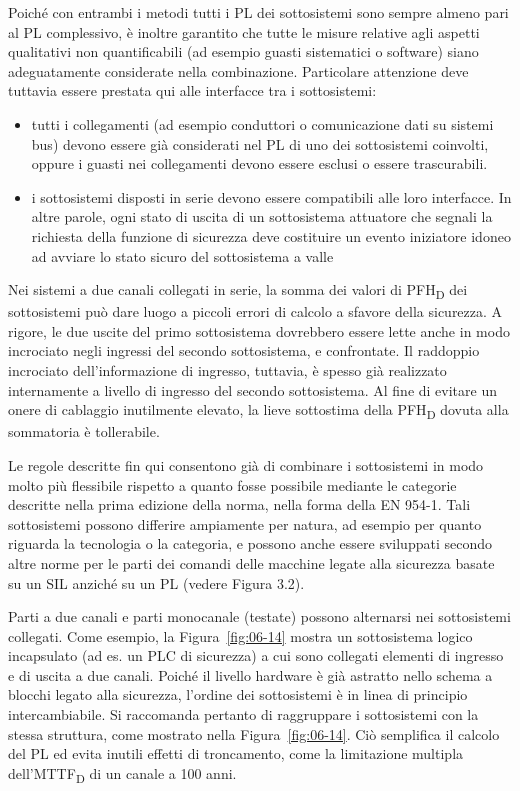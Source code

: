 Poiché con entrambi i metodi tutti i PL dei sottosistemi sono sempre almeno pari al PL complessivo, è inoltre garantito che tutte le misure relative agli aspetti qualitativi non quantificabili (ad esempio guasti sistematici o software) siano adeguatamente considerate nella combinazione. Particolare attenzione deve tuttavia essere prestata qui alle interfacce tra i sottosistemi:
\begin{itemize}
    \item tutti i collegamenti (ad esempio conduttori o comunicazione dati su sistemi bus) devono essere già considerati nel PL di uno dei sottosistemi coinvolti, oppure i guasti nei collegamenti devono essere esclusi o essere trascurabili.
    \item i sottosistemi disposti in serie devono essere compatibili alle loro interfacce. In altre parole, ogni stato di uscita di un sottosistema attuatore che segnali la richiesta della funzione di sicurezza deve costituire un evento iniziatore idoneo ad avviare lo stato sicuro del sottosistema a valle
\end{itemize}

Nei sistemi a due canali collegati in serie, la somma dei valori di PFH\textsubscript{D} dei sottosistemi può dare luogo a piccoli errori di calcolo a sfavore della sicurezza. A rigore, le due uscite del primo sottosistema dovrebbero essere lette anche in modo incrociato negli ingressi del secondo sottosistema, e confrontate. Il raddoppio incrociato dell'informazione di ingresso, tuttavia, è spesso già realizzato internamente a livello di ingresso del secondo sottosistema. Al fine di evitare un onere di cablaggio inutilmente elevato, la lieve sottostima della PFH\textsubscript{D} dovuta alla sommatoria è tollerabile.

Le regole descritte fin qui consentono già di combinare i sottosistemi in modo molto più flessibile rispetto a quanto fosse possibile mediante le categorie descritte nella prima edizione della norma, nella forma della EN 954-1. Tali sottosistemi possono differire ampiamente per natura, ad esempio per quanto riguarda la tecnologia o la categoria, e possono anche essere sviluppati secondo altre norme per le parti dei comandi delle macchine legate alla sicurezza basate su un SIL anziché su un PL (vedere Figura 3.2).

Parti a due canali e parti monocanale (testate) possono alternarsi nei sottosistemi collegati. Come esempio, la Figura~\ref{fig:06-14} mostra un sottosistema logico incapsulato (ad es. un PLC di sicurezza) a cui sono collegati elementi di ingresso e di uscita a due canali. Poiché il livello hardware è già astratto nello schema a blocchi legato alla sicurezza, l'ordine dei sottosistemi è in linea di principio intercambiabile. Si raccomanda pertanto di raggruppare i sottosistemi con la stessa struttura, come mostrato nella Figura~\ref{fig:06-14}. Ciò semplifica il calcolo del PL ed evita inutili effetti di troncamento, come la limitazione multipla dell'MTTF\textsubscript{D} di un canale a 100 anni.

